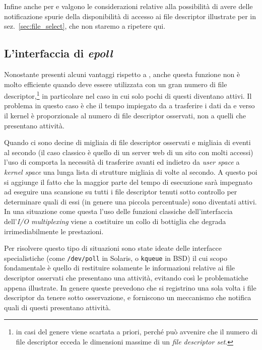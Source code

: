Infine anche per  e  valgono le considerazioni relative
alla possibilità di avere delle notificazione spurie della disponibilità di
accesso ai file descriptor illustrate per  in
sez.~\ref{sec:file_select}, che non staremo a ripetere qui.

\subsection{L'interfaccia di \textit{epoll}}
\label{sec:file_epoll}


Nonostante  presenti alcuni vantaggi rispetto a ,
anche questa funzione non è molto efficiente quando deve essere utilizzata con
un gran numero di file descriptor,\footnote{in casi del genere 
  viene scartata a priori, perché può avvenire che il numero di file
  descriptor ecceda le dimensioni massime di un \textit{file descriptor set}.}
in particolare nel caso in cui solo pochi di questi diventano attivi. Il
problema in questo caso è che il tempo impiegato da  a trasferire i
dati da e verso il kernel è proporzionale al numero di file descriptor
osservati, non a quelli che presentano attività.

Quando ci sono decine di migliaia di file descriptor osservati e migliaia di
eventi al secondo (il caso classico è quello di un server web di un sito con
molti accessi) l'uso di  comporta la necessità di trasferire avanti
ed indietro da \textit{user space} a \textit{kernel space} una lunga lista di
strutture  migliaia di volte al secondo. A questo poi si
aggiunge il fatto che la maggior parte del tempo di esecuzione sarà impegnato
ad eseguire una scansione su tutti i file descriptor tenuti sotto controllo
per determinare quali di essi (in genere una piccola percentuale) sono
diventati attivi. In una situazione come questa l'uso delle funzioni classiche
dell'interfaccia dell'\textit{I/O multiplexing} viene a costituire un collo di
bottiglia che degrada irrimediabilmente le prestazioni.

Per risolvere questo tipo di situazioni sono state ideate delle interfacce
specialistiche (come \texttt{/dev/poll} in Solaris, o \texttt{kqueue} in BSD)
il cui scopo fondamentale è quello di restituire solamente le informazioni
relative ai file descriptor osservati che presentano una attività, evitando
così le problematiche appena illustrate. In genere queste prevedono che si
registrino una sola volta i file descriptor da tenere sotto osservazione, e
forniscono un meccanismo che notifica quali di questi presentano attività.

